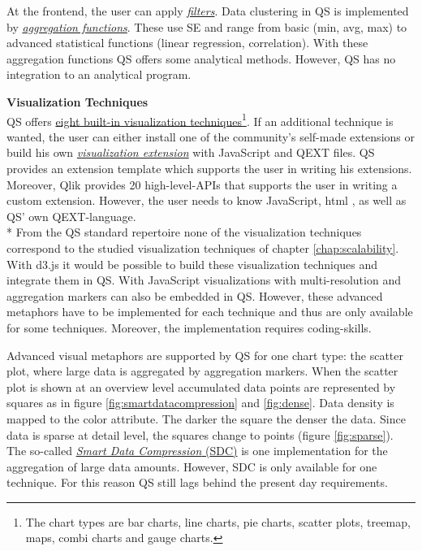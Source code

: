 At the frontend, the user can apply \href{https://help.qlik.com/en-US/sense/2.1/Subsystems/Hub/Content/Visualizations/FilterPane/filter-pane.htm}{\textit{filters}}.
Data clustering in \gls{QS}   is implemented by \href{https://help.qlik.com/en-US/sense/3.2/Subsystems/Hub/Content/Scripting/AggregationFunctions/aggregation-functions.htm}{\textit{aggregation functions}}. These use \gls{SE} and range from basic  (min, avg, max) to advanced statistical functions (linear regression, correlation). With these aggregation functions \gls{QS}   offers some analytical methods. However, \gls{QS}   has no integration to an analytical program.
\par

\textbf{Visualization Techniques}\\
QS offers \href{https://help.qlik.com/en-US/sense/2.1/Subsystems/Hub/Content/Visualizations/visualizations.htm}{eight built-in visualization techniques}\footnote{The chart types are bar charts, line charts, pie charts, scatter plots, treemap, maps, combi charts and gauge charts.}. If an additional technique is wanted, the user can either install one of the community's self-made extensions or build his own \href{https://help.qlik.com/en-US/sense-developer/3.2/Subsystems/Extensions/Content/extensions-getting-started.htm}{\textit{visualization extension}} with JavaScript and QEXT files. \gls{QS}   provides an extension template which supports the user in writing his extensions. Moreover, Qlik provides 20 high-level-APIs that supports the user in writing a custom extension. However, the user needs to know JavaScript, html  , as well as \gls{QS}'   own QEXT-language. \\*
From the \gls{QS} standard repertoire none of the visualization techniques correspond to the studied visualization techniques of chapter \ref{chap:scalability}. With d3.js it would be possible to build these visualization techniques and integrate them in \gls{QS}. With JavaScript visualizations with multi-resolution and aggregation markers can also be embedded in \gls{QS}. However, these advanced metaphors have to be implemented for each technique and thus are only available for some techniques. Moreover, the implementation requires coding-skills. 

Advanced visual metaphors are supported by \gls{QS} for one chart type: the scatter plot, where large data is aggregated by aggregation markers. When the scatter plot is shown at an overview level accumulated data points are represented by squares as in figure \ref{fig:smartdatacompression} and \ref{fig:dense}. Data density is mapped to the color attribute.  The darker the square the denser the data. Since data is sparse at detail level, the squares change to points (figure \ref{fig:sparse}). The so-called \href{https://help.qlik.com/en-US/sense/2.1/Subsystems/Hub/Content/Visualizations/scatter plot/scatter-plot.htm}{\textit{Smart Data Compression} (\gls{SDC})} is one implementation for the aggregation of large data amounts. However, \gls{SDC} is only available for one technique. For this reason \gls{QS} still lags behind the present day requirements.


